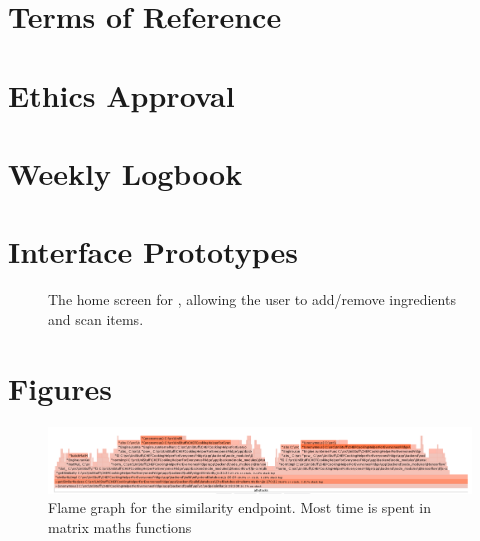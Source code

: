 \documentclass[11pt, twoside, a4paper]{report}
\begin{document}
\section{Terms of Reference}


\section{Ethics Approval}
\label{sec:ethics_approval}


\section{Weekly Logbook}
\raggedbottom

\flushbottom



\section{Interface Prototypes}
\begin{figure}
    \centering
    
    \caption{The home screen for \chef{}, allowing the user to add/remove ingredients and scan items.}
\end{figure}

\section{Figures}
\begin{figure}
    \centering
    \caption{\label{fig:similarity_flamegraph}Flame graph for the similarity endpoint. Most time is spent in matrix maths functions}
    \includegraphics[angle=90,height=0.9\textheight]{figures/similarity_flamegraph.png}
\end{figure}


\todos

\end{document}
